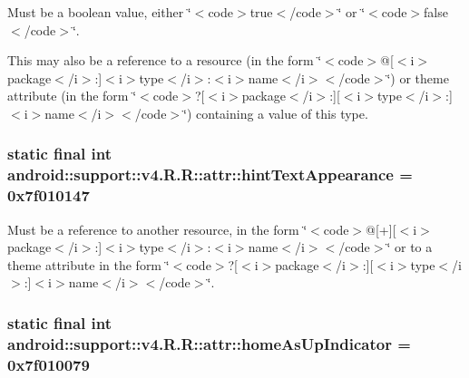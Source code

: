 Must be a boolean value, either \char`\"{}$<$code$>$true$<$/code$>$\char`\"{} or \char`\"{}$<$code$>$false$<$/code$>$\char`\"{}. 

This may also be a reference to a resource (in the form \char`\"{}$<$code$>$@\mbox{[}$<$i$>$package$<$/i$>$:\mbox{]}$<$i$>$type$<$/i$>$:$<$i$>$name$<$/i$>$$<$/code$>$\char`\"{}) or theme attribute (in the form \char`\"{}$<$code$>$?\mbox{[}$<$i$>$package$<$/i$>$:\mbox{]}\mbox{[}$<$i$>$type$<$/i$>$:\mbox{]}$<$i$>$name$<$/i$>$$<$/code$>$\char`\"{}) containing a value of this type. \hypertarget{classandroid_1_1support_1_1v4_1_1_r_1_1attr_f156908224e9095cd11a4097855b4f8a}{
\subsubsection[{hintTextAppearance}]{\setlength{\rightskip}{0pt plus 5cm}static final int android::support::v4.R.R::attr::hintTextAppearance = 0x7f010147}}
\label{classandroid_1_1support_1_1v4_1_1_r_1_1attr_f156908224e9095cd11a4097855b4f8a}


Must be a reference to another resource, in the form \char`\"{}$<$code$>$@\mbox{[}+\mbox{]}\mbox{[}$<$i$>$package$<$/i$>$:\mbox{]}$<$i$>$type$<$/i$>$:$<$i$>$name$<$/i$>$$<$/code$>$\char`\"{} or to a theme attribute in the form \char`\"{}$<$code$>$?\mbox{[}$<$i$>$package$<$/i$>$:\mbox{]}\mbox{[}$<$i$>$type$<$/i$>$:\mbox{]}$<$i$>$name$<$/i$>$$<$/code$>$\char`\"{}. \hypertarget{classandroid_1_1support_1_1v4_1_1_r_1_1attr_bc32b0eec3b75089c984565f65d51e30}{
\subsubsection[{homeAsUpIndicator}]{\setlength{\rightskip}{0pt plus 5cm}static final int android::support::v4.R.R::attr::homeAsUpIndicator = 0x7f010079}}
\label{classandroid_1_1support_1_1v4_1_1_r_1_1attr_bc32b0eec3b75089c984565f65d51e30}


